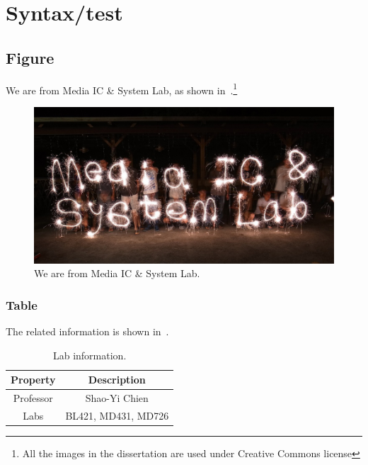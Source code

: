 \chapter{Syntax/test}

\section{Figure}
\label{sec:figure}
We are from Media IC \& System Lab, as shown in~.\footnote{All the images in the dissertation are used under Creative Commons license}


\begin{figure}
\begin{center}
\includegraphics[width=0.8\linewidth]{inc/1_introduction/figure/misl.jpg}
\end{center}
\caption{
We are from Media IC \& System Lab.
}
\label{fig:misl}
\end{figure}


\subsection{Table}
\label{sec:picture}
The related information is shown in~.

\begin{table}[p]
\horgap{4.5pt}
\caption{Lab information.}
\vspace{5pt}
\label{tab:lab_information}
\centering
\footnotesize 
\begin{tabular}{cc}
\toprule
Property & Description \\
\midrule
Professor & Shao-Yi Chien \\
Labs & BL421, MD431, MD726 \\
\bottomrule
\end{tabular}
\end{table}
